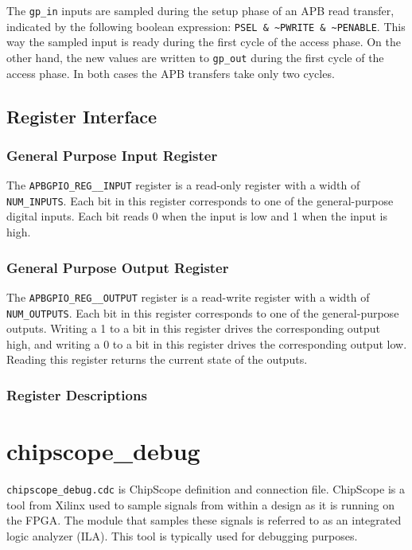 The \texttt{gp\_in} inputs are sampled during the setup phase of an APB read transfer, indicated by the following boolean expression: \texttt{PSEL \& \textasciitilde PWRITE \& \textasciitilde PENABLE}. This way the sampled input is ready during the first cycle of the access phase. On the other hand, the new values are written to \texttt{gp\_out} during the first cycle of the access phase. In both cases the APB transfers take only two cycles.

\subsection{Register Interface} \label{gpio-registers}
\subsubsection{General Purpose Input Register}
The \texttt{APBGPIO\_REG\_\_INPUT} register is a read-only register with a width of \texttt{NUM\_INPUTS}. Each bit in this register corresponds to one of the general-purpose digital inputs. Each bit reads 0 when the input is low and 1 when the input is high.

\subsubsection{General Purpose Output Register}
The \texttt{APBGPIO\_REG\_\_OUTPUT} register is a read-write register with a width of \texttt{NUM\_OUT\-PUTS}. Each bit in this register corresponds to one of the general-purpose outputs. Writing a 1 to a bit in this register drives the corresponding output high, and writing a 0 to a bit in this register drives the corresponding output low. Reading this register returns the current state of the outputs.

\subsubsection{Register Descriptions}

\section{chipscope\_debug}
\texttt{chipscope\_debug.cdc} is ChipScope definition and connection file. ChipScope is a tool from Xilinx used to sample signals from within a design as it is running on the FPGA. The module that samples these signals is referred to as an integrated logic analyzer (ILA). This tool is typically used for debugging purposes.

